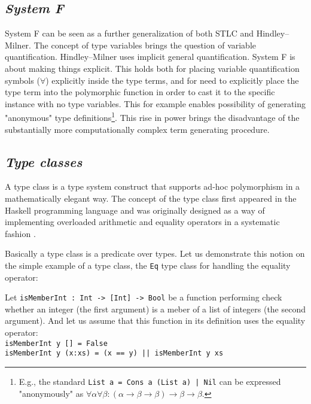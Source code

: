 \documentclass[11pt]{article}
\newcommand{\ar}{\rightarrow\xspace}
\newcommand{\HM}{Hindley–Milner\xspace}
\newcommand{\red}[1]{{\color{red} #1}}
\begin{document}
\begin{article}

\subsection{\textit{System F}}

System F \red{\citep{TODO}} can be seen as a further generalization of both STLC and \HM. 
The concept of type variables brings the question of variable quantification. 
\HM uses implicit general quantification. System F is about making things explicit.
This holds both for placing variable quantification symbols ($\forall$) explicitly inside the type terms, and for need to explicitly place the type term into the polymorphic function in order to cast it to the specific instance with no type variables. This for example enables possibility of generating "anonymous" type definitions\footnote{E.g., the standard \texttt{List a = Cons a (List a) | Nil} can be expressed "anonymously" as $\forall \alpha \forall \beta : (\alpha \ar \beta \ar \beta) \ar \beta \ar \beta  $.}. This rise in power brings the disadvantage of the substantially more computationally complex term generating procedure. 

\subsection{\textit{Type classes}}

A type class is a type system construct that supports ad-hoc polymorphism in a mathematically elegant way. The concept of the type class first appeared in the Haskell programming language \citep{morris2013type} and was originally designed as a way of implementing overloaded arithmetic and equality operators in a systematic fashion \citep{wadler1989make}.

Basically a type class is a predicate over types. Let us demonstrate this notion on the simple example of a type class, the \texttt{Eq} type class for handling the equality operator: 

Let \texttt{isMemberInt : Int -> [Int] -> Bool} be a function performing check whether an integer (the first argument) is a meber of a list of integers (the second argument). And let us assume that this function in its definition uses the equality operator:
\texttt{~\\
isMemberInt y [] = False\\
isMemberInt y (x:xs) = (x == y) || isMemberInt y xs} 


\end{article}
\end{document}
